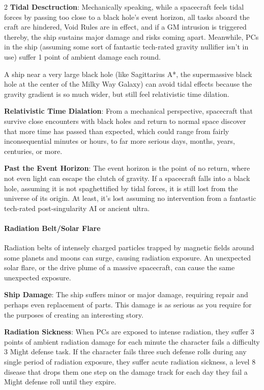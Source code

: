 \begin{multicols}{2}
\textbf{Tidal Desctruction}: Mechanically speaking, while a spacecraft feels tidal forces by passing too close to a black hole’s event horizon, all tasks aboard the craft are hindered, Void Rules are in effect, and if a GM intrusion is triggered thereby, the ship sustains major damage and risks coming apart. Meanwhile, PCs in the ship (assuming some sort of fantastic tech-rated gravity nullifier isn’t in use) suffer 1 point of ambient damage each round. 

A ship near a very large black hole (like Sagittarius A*, the supermassive black hole at the center of the Milky Way Galaxy) can avoid tidal effects because the gravity gradient is so much wider, but still feel relativistic time dilation.

\textbf{Relativistic Time Dialation}: From a mechanical perspective, spacecraft that survive close encounters with black holes and return to normal space discover that more time has passed than expected, which could range from fairly inconsequential minutes or hours, to far more serious days, months, years, centuries, or more.

\textbf{Past the Event Horizon}: The event horizon is the point of no return, where not even light can escape the clutch of gravity. If a spacecraft falls into a black hole, assuming it is not spaghettified by tidal forces, it is still lost from the universe of its origin. At least, it’s lost assuming no intervention from a fantastic tech-rated post-singularity AI or ancient ultra.

\paragraph{Radiation Belt/Solar Flare}

Radiation belts of intensely charged particles trapped by magnetic fields around some planets and moons can surge, causing radiation exposure. An unexpected solar flare, or the drive plume of a massive spacecraft, can cause the same unexpected exposure.

\textbf{Ship Damage}: The ship suffers minor or major damage, requiring repair and perhaps even replacement of parts. This damage is as serious as you require for the purposes of creating an interesting story.

\textbf{Radiation Sickness}: When PCs are exposed to intense radiation, they suffer 3 points of ambient radiation damage for each minute the character fails a difficulty 3 Might defense task. If the character fails three such defense rolls during any single period of radiation exposure, they suffer acute radiation sickness, a level 8 disease that drops them one step on the damage track for each day they fail a Might defense roll until they expire.


\end{multicols}
